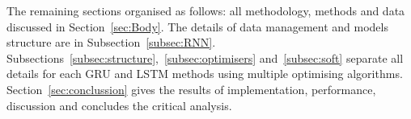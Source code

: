 %
%
The remaining sections organised as follows: all methodology, methods and data discussed in Section~\ref{sec:Body}.
The details of data management and models structure are in Subsection~\ref{subsec:RNN}.
Subsections~\ref{subsec:structure},~\ref{subsec:optimisers} and~\ref{subsec:soft} separate all details for each GRU and LSTM methods using multiple optimising algorithms.
Section~\ref{sec:conclussion} gives the results of implementation, performance, discussion and concludes the critical analysis.